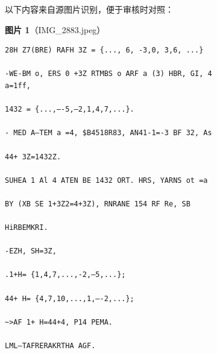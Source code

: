 \begin{note}
以下内容来自源图片识别，便于审核时对照：

\textbf{图片 1}（IMG\_2883.jpeg）
\begin{Verbatim}[fontsize=\small]
28H Z7(BRE) RAFH 3Z = {..., 6, -3,0, 3,6, ...}

-WE-BM o, ERS 0 +3Z RTMBS o ARF a (3) HBR, GI, 4
a=1ff,

1432 = {...,—-5,—2,1,4,7,...}.

- MED A—TEM a =4, $B4518R83, AN41-1=-3 BF 32, As

44+ 3Z=1432Z.

SUHEA 1 Al 4 ATEN BE 1432 ORT. HRS, YARNS ot =a

BY (XB SE 1+3Z2=4+3Z), RNRANE 154 RF Re, SB

HiRBEMKRI.

-EZH, SH=3Z,

.1+H= {1,4,7,...,-2,—5,...};

44+ H= {4,7,10,...,1,—-2,...};

~>AF 1+ H=44+4, P14 PEMA.

LML—TAFRERAKRTHA AGF.
\end{Verbatim}


\end{note}
